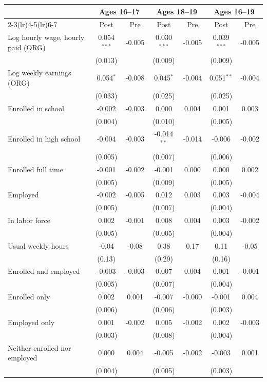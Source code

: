 \begin{tabular}{lcccccc}
\toprule
 & \multicolumn{2}{c}{Ages 16--17} & \multicolumn{2}{c}{Ages 18--19} & \multicolumn{2}{c}{Ages 16--19} \\
\cmidrule(lr){2-3}\cmidrule(lr){4-5}\cmidrule(lr){6-7}
 & Post & Pre & Post & Pre & Post & Pre \\
\midrule
Log hourly wage, hourly paid (ORG) & 0.054$^{***}$ & -0.005 & 0.030$^{***}$ & -0.005 & 0.039$^{***}$ & -0.005 \\
 & (0.013) &  & (0.009) &  & (0.009) &  \\
Log weekly earnings (ORG) & 0.054$^{*}$ & -0.008 & 0.045$^{*}$ & -0.004 & 0.051$^{**}$ & -0.004 \\
 & (0.033) &  & (0.025) &  & (0.025) &  \\
Enrolled in school & -0.002 & -0.003 & 0.000 & 0.004 & 0.001 & 0.003 \\
 & (0.004) &  & (0.010) &  & (0.005) &  \\
Enrolled in high school & -0.004 & -0.003 & -0.014$^{**}$ & -0.014 & -0.006 & -0.002 \\
 & (0.005) &  & (0.007) &  & (0.006) &  \\
Enrolled full time & -0.001 & -0.002 & -0.001 & 0.000 & 0.000 & 0.002 \\
 & (0.005) &  & (0.009) &  & (0.005) &  \\
Employed & -0.002 & -0.005 & 0.012 & 0.003 & 0.003 & -0.004 \\
 & (0.005) &  & (0.007) &  & (0.004) &  \\
In labor force & 0.002 & -0.001 & 0.008 & 0.004 & 0.003 & -0.002 \\
 & (0.005) &  & (0.005) &  & (0.004) &  \\
Usual weekly hours & -0.04 & -0.08 & 0.38 & 0.17 & 0.11 & -0.05 \\
 & (0.13) &  & (0.29) &  & (0.16) &  \\
Enrolled and employed & -0.003 & -0.003 & 0.007 & 0.004 & 0.001 & -0.001 \\
 & (0.005) &  & (0.007) &  & (0.004) &  \\
Enrolled only & 0.002 & 0.001 & -0.007 & -0.000 & -0.001 & 0.004 \\
 & (0.006) &  & (0.006) &  & (0.003) &  \\
Employed only & 0.001 & -0.002 & 0.005 & -0.002 & 0.002 & -0.003 \\
 & (0.003) &  & (0.008) &  & (0.004) &  \\
Neither enrolled nor employed & 0.000 & 0.004 & -0.005 & -0.002 & -0.003 & 0.001 \\
 & (0.004) &  & (0.005) &  & (0.003) &  \\
\bottomrule
\end{tabular}
